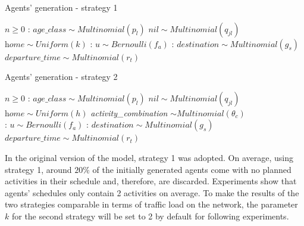 \pagebreak
\begin{algorithm}[H]
\caption{Agents' generation - strategy 1}\label{alg1}
\begin{algorithmic}
\Require $n \geq 0$
:
\State $\textit{age\_class} \sim Multinomial(p_l)$ 
\State $\textit{nil} \sim Multinomial(q_{jl})$ 
\State $\textit{home} \sim Uniform(k)$ 
:
\State $ \textit{u} \sim Bernoulli(f_a)$ 
:
    \State $\textit{destination} \sim Multinomial(g_s)$ \\
    \State $\textit{departure\_time} \sim Multinomial(r_t)$ \\
\EndIf
\EndFor
\EndFor
\end{algorithmic}
\end{algorithm}

\begin{algorithm}[H]
\caption{Agents' generation - strategy 2}\label{alg2}
\begin{algorithmic}
\Require $n \geq 0$
:
\State $\textit{age\_class} \sim Multinomial(p_l)$ 
\State $\textit{nil} \sim Multinomial(q_{jl})$ 
\State $\textit{home} \sim Uniform(h)$ 
\State \textit{activity\_combination} $\sim Multinomial(\theta_c)$
\\
:
\State $ \textit{u} \sim Bernoulli(f_a)$ 
:
    \State $\textit{destination} \sim Multinomial(g_s)$ \\
    \State $\textit{departure\_time} \sim Multinomial(r_t)$ \\
\EndIf
\EndFor
\EndFor
\end{algorithmic}
\end{algorithm}
In the original version of the model, strategy 1 was adopted. On average, using strategy 1, around $20\%$ of the initially generated agents come with no planned activities in their schedule and, therefore, are discarded. Experiments show that agents' schedules only contain 2 activities on average. To make the results of the two strategies comparable in terms of traffic load on the network, the parameter $k$ for the second strategy will be set to 2 by default for following experiments. 

